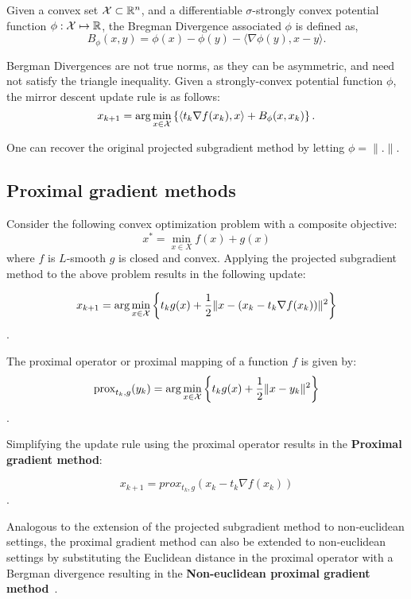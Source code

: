 \begin{definition}
	\label{def:bregman}
	Given a convex set $\mathcal{X} \subset \mathbb{R}^n$, and a differentiable $\sigma$-strongly convex potential
	function $\phi: \mathcal{X} \mapsto \mathbb{R}$, the Bregman Divergence associated $\phi$ is defined as, $$
		B_\phi(x, y) = \phi(x) - \phi(y) - \langle \nabla \phi(y), x-y \rangle.
	$$
\end{definition}

Bergman Divergences are not true norms, as they can be asymmetric, and need not satisfy the
triangle inequality.
Given a strongly-convex potential function $\phi$, the mirror descent update rule is as follows:
\begin{equation}
	x_{k+1} = \arg \min_{x \in \mathcal{X}} \left \{ \left \langle t_k \nabla f(x_k), x
	\right \rangle + B_\phi(x, x_k) \right \}.
\end{equation}

One can recover the original projected subgradient method by letting $\phi=\|.
	\|$.

\subsection{Proximal gradient methods}
Consider the following convex optimization problem with a composite objective:
\begin{equation*}
	x^{\ast} = \min_{x \in X} f(x) + g(x)
\end{equation*} where $f$ is $L$-smooth $g$ is closed and
convex.
Applying the projected subgradient method to the above problem results in the following update:

$$ x_{k+1} = \arg \min_{x \in \mathcal{X}} \left\{ t_k g(x) + \frac{1}{2} \| x - (x_k
	- t_k \nabla f(x_k)) \|^2 \right\}$$.

\begin{definition} The
	proximal operator or proximal mapping of a function $f$ is given by:
	$$\text{prox}_{t_k, g}(y_k) = \arg \min_{x \in \mathcal{X}} \left\{ t_k g(x) + \frac{1}{2}\| x - y_k \|^2 \right\} $$.
\end{definition}

Simplifying the update rule using the proximal operator results in the \textbf{Proximal gradient
	method}:

$$ x_{k+1} = prox_{t_k, g}(x_k - t_k \nabla f(x_k))$$.

Analogous to the extension of the projected subgradient method to non-euclidean settings, the
proximal gradient method can also be extended to non-euclidean settings by substituting the
Euclidean distance in the proximal operator with a Bergman divergence resulting in the
\textbf{Non-euclidean proximal gradient method}~\cite{tsengApproximation2010,beckFirstOrder2017}.

